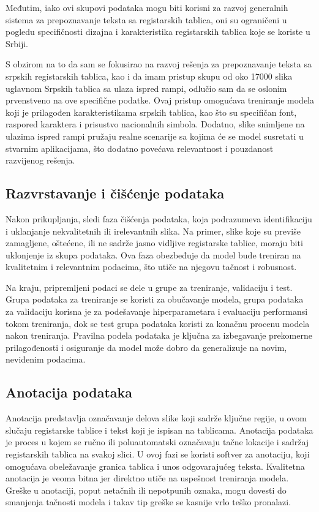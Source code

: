 \documentclass[a4paper,12pt]{article}
\begin{document}
	Međutim, iako ovi skupovi podataka mogu biti korisni za razvoj generalnih sistema za prepoznavanje teksta sa registarskih tablica, oni su ograničeni u pogledu specifičnosti dizajna i karakteristika registarskih tablica koje se koriste u Srbiji.
	
	S obzirom na to da sam se fokusirao na razvoj rešenja za prepoznavanje teksta sa srpskih registarskih tablica, kao i da imam pristup skupu od oko 17000 slika uglavnom Srpskih tablica sa ulaza ispred rampi, odlučio sam da se oslonim prvenstveno na ove specifične podatke. Ovaj pristup omogućava treniranje modela koji je prilagođen karakteristikama srpskih tablica, kao što su specifičan font, raspored karaktera i prisustvo nacionalnih simbola. Dodatno, slike snimljene na ulazima ispred rampi pružaju realne scenarije sa kojima će se model susretati u stvarnim aplikacijama, što dodatno povećava relevantnost i pouzdanost razvijenog rešenja.
	
	\subsection{Razvrstavanje i čišćenje podataka}
	Nakon prikupljanja, sledi faza čišćenja podataka, koja podrazumeva identifikaciju i uklanjanje nekvalitetnih ili irelevantnih slika. Na primer, slike koje su previše zamagljene, oštećene, ili ne sadrže jasno vidljive registarske tablice, moraju biti uklonjenje iz skupa podataka. Ova faza obezbeđuje da model bude treniran na kvalitetnim i relevantnim podacima, što utiče na njegovu tačnost i robusnost.
	
	Na kraju, pripremljeni podaci se dele u grupe za treniranje, validaciju i test. Grupa podataka za treniranje se koristi za obučavanje modela, grupa podataka za validaciju korisna je za podešavanje hiperparametara i evaluaciju performansi tokom treniranja, dok se test grupa podataka koristi za konačnu procenu modela nakon treniranja. Pravilna podela podataka je ključna za izbegavanje prekomerne prilagođenosti i osiguranje da model može dobro da generalizuje na novim, neviđenim podacima.
	
	\subsection{Anotacija podataka}
	Anotacija predstavlja označavanje delova slike koji sadrže ključne regije, u ovom slučaju registarske tablice i tekst koji je ispisan na tablicama. Anotacija podataka je proces u kojem se ručno ili poluautomatski označavaju tačne lokacije i sadržaj registarskih tablica na svakoj slici. U ovoj fazi se koristi softver za anotaciju, koji omogućava obeležavanje granica tablica i unos odgovarajućeg teksta. Kvalitetna anotacija je veoma bitna jer direktno utiče na uspešnost treniranja modela. Greške u anotaciji, poput netačnih ili nepotpunih oznaka, mogu dovesti do smanjenja tačnosti modela i takav tip greške se kasnije vrlo teško pronalazi.
	
\end{document}
